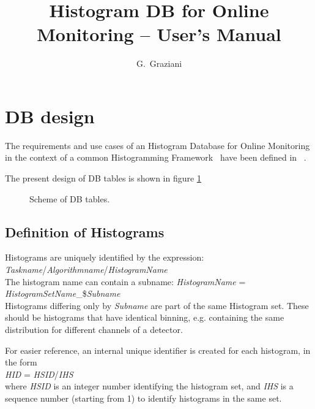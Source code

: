 \documentclass{lhcbnote}
\title{Histogram DB for Online Monitoring -- User's Manual}
\author{G.~Graziani}
\begin{document}
\maketitle


\section{DB design}
The requirements and use cases of an Histogram Database for Online
Monitoring in the context of a common Histogramming Framework~\cite{genhisto}
have been defined in ~\cite{dbdesign}.

The present design of DB tables is shown in figure \ref{DBschema}


\begin{figure}[htb]
\centerline{}
\caption{Scheme of DB tables. }
\label{DBschema}
\end{figure}

\subsection{Definition of Histograms}
Histograms are uniquely identified by the expression:\\
{\it Taskname}/{\it Algorithmname}/{\it HistogramName}\\
The histogram name can contain a subname:
{\it HistogramName} = {\it HistogramSetName}\_\${\it Subname} \\
Histograms differing only by {\it Subname} are part of the same
Histogram set. These should be histograms that have identical binning,
e.g. containing the same distribution for different channels of a detector.

For easier reference, an internal unique identifier is created for
each histogram, in the form\\
{\it HID} = {\it HSID}/{\it IHS}\\
where {\it HSID} is an integer number identifying the histogram set,
and {\it IHS} is a sequence number (starting from 1) to identify histograms in
the same set.
\end{document}
